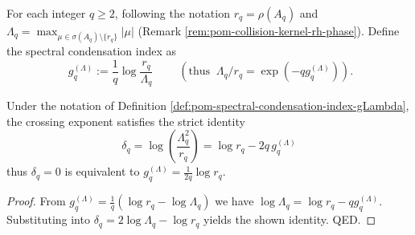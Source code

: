 
\begin{definition}\label{def:pom-spectral-condensation-index-gLambda}
For each integer \(q\ge 2\), following the notation \(r_q=\rho(A_q)\) and
\(
\Lambda_q=\max_{\mu\in\sigma(A_q)\setminus\{r_q\}}|\mu|
\)
(Remark \ref{rem:pom-collision-kernel-rh-phase}).
Define the spectral condensation index as
\[
\boxed{\;
g_q^{(\Lambda)}:=\frac{1}{q}\log\frac{r_q}{\Lambda_q}\;}
\qquad(\text{thus }\ \Lambda_q/r_q=\exp(-qg_q^{(\Lambda)})).
\]
\end{definition}

\begin{corollary}\label{cor:pom-deltaq-gLambda-identity}
Under the notation of Definition \ref{def:pom-spectral-condensation-index-gLambda}, the crossing exponent satisfies the strict identity
\[
\boxed{\;
\delta_q=\log\!\left(\frac{\Lambda_q^2}{r_q}\right)=\log r_q-2q\,g_q^{(\Lambda)}\;}
\]
thus \(\delta_q=0\) is equivalent to \(g_q^{(\Lambda)}=\frac{1}{2q}\log r_q\).
\end{corollary}
\begin{proof}
From \(g_q^{(\Lambda)}=\frac{1}{q}(\log r_q-\log\Lambda_q)\) we have \(\log\Lambda_q=\log r_q-qg_q^{(\Lambda)}\).
Substituting into \(\delta_q=2\log\Lambda_q-\log r_q\) yields the shown identity. QED.
\end{proof}

